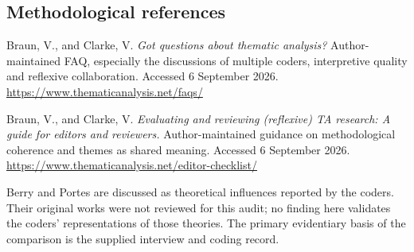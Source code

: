 \documentclass[10pt,a4paper]{article}
\begin{document}
\subsection*{Methodological references}
Braun, V., and Clarke, V. \emph{Got questions about thematic analysis?} Author-maintained FAQ, especially the discussions of multiple coders, interpretive quality and reflexive collaboration. Accessed 6 September 2026. \url{https://www.thematicanalysis.net/faqs/}

Braun, V., and Clarke, V. \emph{Evaluating and reviewing (reflexive) TA research: A guide for editors and reviewers.} Author-maintained guidance on methodological coherence and themes as shared meaning. Accessed 6 September 2026. \url{https://www.thematicanalysis.net/editor-checklist/}

{\footnotesize\color{muted}Berry and Portes are discussed as theoretical influences reported by the coders. Their original works were not reviewed for this audit; no finding here validates the coders' representations of those theories. The primary evidentiary basis of the comparison is the supplied interview and coding record.}
\end{document}
